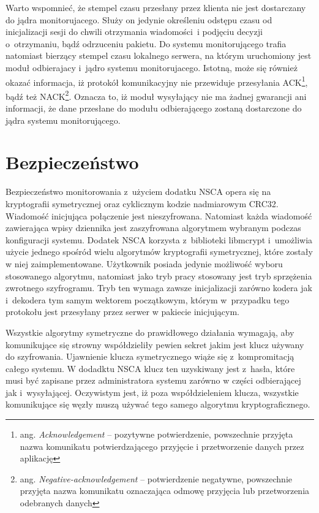 Warto wspomnieć, że stempel czasu przesłany przez klienta nie jest
dostarczany do jądra monitorujacego. Służy on jedynie określeniu
odstępu czasu od inicjalizacji sesji do chwili otrzymania wiadomości~i
podjęciu decyzji o~otrzymaniu, bądź odrzuceniu pakietu. Do systemu
monitorującego trafia natomiast bierzący stempel czasu lokalnego
serwera, na którym uruchomiony jest moduł odbierajacy i~jądro systemu
monitorujacego. Istotną, może się również okazać informacja, iż
protokół komunikacyjny nie przewiduje przesyłania
ACK\footnote{ang. {\em Acknowledgement} -- pozytywne potwierdzenie,
  powszechnie przyjęta nazwa komunikatu potwierdzającego przyjęcie i
  przetworzenie danych przez aplikację}, bądź też
NACK\footnote{ang. {\em Negative-acknowledgement} -- potwierdzenie
  negatywne, powszechnie przyjęta nazwa komunikatu oznaczająca odmowę
  przyjęcia lub przetworzenia odebranych danych}. Oznacza to, iż moduł
wysyłający nie ma żadnej gwarancji ani informacji, że dane przesłane
do modułu odbierającego zostaną dostarczone do jądra systemu
monitorującego.

\section[Bezpieczeństwo][Bezpieczeństwo]{Bezpieczeństwo}

Bezpieczeństwo monitorowania z~użyciem dodatku NSCA opera się na
kryptografii symetrycznej oraz cyklicznym kodzie nadmiarowym
CRC32. Wiadomość inicjująca połączenie jest nieszyfrowana. Natomiast
każda wiadomość zawierająca wpisy dziennika jest zaszyfrowana
algorytmem wybranym podczas konfiguracji systemu. Dodatek NSCA
korzysta z~biblioteki libmcrypt i~umożliwia użycie jednego spośród
wielu algorytmów kryptografii symetrycznej, które zostały w niej
zaimplementowane. Użytkownik posiada jedynie możliwość wyboru
stosowanego algorytmu, natomiast jako tryb pracy stosowany jest tryb
sprzężenia zwrotnego szyfrogramu. Tryb ten wymaga zawsze inicjalizacji
zarówno kodera jak i~dekodera tym samym wektorem początkowym, którym
w~przypadku tego protokołu jest przesyłany przez serwer w pakiecie
inicjującym.

Wszystkie algorytmy symetryczne do prawidłowego działania wymagają,
aby komunikujące się strowny współdzieliły pewien sekret jakim jest
klucz używany do szyfrowania. Ujawnienie klucza symetrycznego wiąże
się z~kompromitacją całego systemu. W dodadktu NSCA klucz ten
uzyskiwany jest z~hasła, które musi być zapisane przez administratora
systemu zarówno w części odbierającej jak i~wysyłającej. Oczywistym
jest, iż poza współdzieleniem klucza, wszystkie komunikujące się węzły
muszą używać tego samego algorytmu kryptograficznego.

